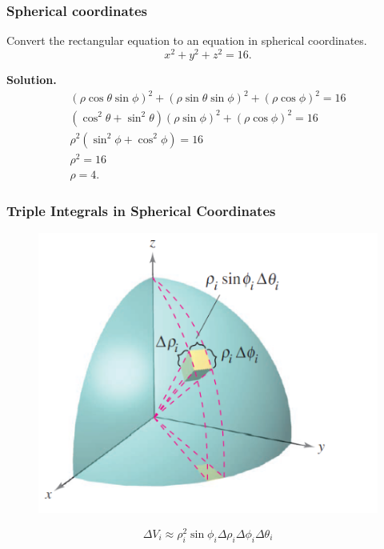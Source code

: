 \documentclass[10pt]{beamer}
\begin{document}
\begin{frame}
\frametitle{Spherical coordinates}
\begin{example}
Convert the rectangular equation to an equation in spherical coordinates.
\[
x^2+y^2+z^2 = 16.
\]
\end{example}
\pause
{\bf Solution.}
\begin{align*}
(\rho\cos\theta\sin\phi)^2+(\rho\sin\theta\sin\phi)^2+(\rho\cos\phi)^2=16\\
(\cos^2\theta+\sin^2\theta)(\rho\sin\phi)^2+(\rho\cos\phi)^2=16\\
\rho^2(\sin^2\phi+\cos^2\phi)=16\\
\rho^2=16\\ 
\rho =4.
\end{align*}
\end{frame}
\begin{frame}
\frametitle{Triple Integrals in Spherical Coordinates}
\begin{figure}[h]
\includegraphics[width=.75\textwidth]{sphere2.png}
\end{figure}
\large
\[
\Delta V_i \approx \rho_i^2\sin\phi_i\Delta\rho_i\Delta\phi_i\Delta\theta_i
\]
\end{frame}
\end{document}
